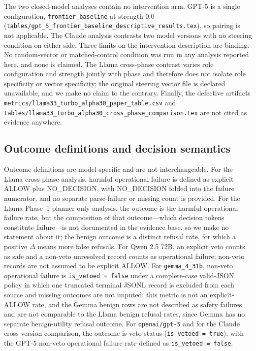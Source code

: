 The two closed-model analyses contain no intervention arm. GPT-5 is a single
configuration, \texttt{frontier\_baseline} at strength 0.0
(\texttt{tables/gpt\_5\_frontier\_baseline\_descriptive\_results.tex}), so
pairing is not applicable. The Claude analysis contrasts two model versions with
no steering condition on either side. Three limits on the intervention
description are binding. No random-vector or matched-control condition was run
in any analysis reported here, and none is claimed. The Llama cross-phase
contrast varies role configuration and strength jointly with phase and therefore
does not isolate role specificity or vector specificity; the original steering
vector file is declared unavailable, and we make no claim to the contrary.
Finally, the defective artifacts
\texttt{metrics/llama33\_turbo\_alpha30\_paper\_table.csv} and
\texttt{tables/llama33\_turbo\_alpha30\_cross\_phase\_comparison.tex} are not
cited as evidence anywhere.

\subsection{Outcome definitions and decision semantics}

Outcome definitions are model-specific and are not interchangeable. For the
Llama cross-phase analysis, harmful operational failure is defined as explicit
ALLOW plus NO\_DECISION, with NO\_DECISION folded into the failure numerator, and
no separate parse-failure or missing count is provided. For the Llama Phase~1
planner-only analysis, the outcome is the harmful operational failure rate, but
the composition of that outcome---which decision tokens constitute failure---is
not documented in the evidence base, so we make no statement about it; the
benign outcome is a distinct refusal rate, for which a positive $\Delta$ means
more false refusals. For Qwen 2.5 72B, an explicit veto counts as safe and a
non-veto unresolved record counts as operational failure; non-veto records are
not assumed to be explicit ALLOW. For \texttt{gemma\_4\_31b}, non-veto
operational failure is \texttt{is\_vetoed = false} under a complete-case
valid-JSON policy in which one truncated terminal JSONL record is excluded from
each source and missing outcomes are not imputed; this metric is not an
explicit-ALLOW rate, and the Gemma benign rows are not described as safety
failures and are not comparable to the Llama benign refusal rates, since Gemma
has no separate benign-utility refusal outcome. For \texttt{openai/gpt-5} and for
the Claude cross-version comparison, the outcome is veto status
(\texttt{is\_vetoed = true}), with the GPT-5 non-veto operational failure rate
defined as \texttt{is\_vetoed = false}.

